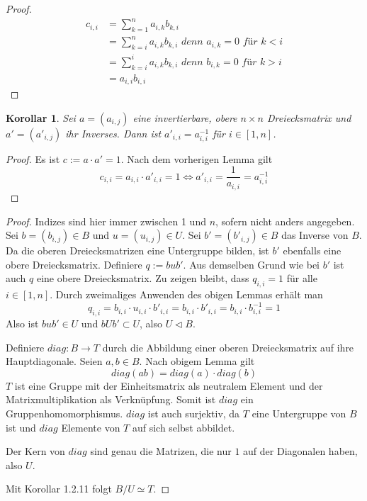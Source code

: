 \documentclass[10pt,a4paper]{article}
\newtheorem{corollary}{Korollar}
\begin{document}
\begin{proof}
  \begin{align*}
    c_{i, i} & = \sum_{k = 1}^{n} a_{i, k} b_{k, i}\\
    & = \sum_{k = i}^{n} a_{i, k} b_{k, i}\textit{ denn $a_{i, k} = 0$ für $k < i$}\\
    & = \sum_{k = i}^{i} a_{i, k} b_{k, i}\textit{ denn $b_{i, k} = 0$ für $k > i$}\\
    & = a_{i, i} b_{i, i}
  \end{align*}
\end{proof}

\begin{corollary}
  Sei $a = (a_{i, j})$ eine invertierbare, obere $n \times n$ Dreiecksmatrix und $a' = (a'_{i, j})$ ihr Inverses.
  Dann ist $a'_{i, i} = a_{i, i}^{-1}$ für $i \in [1, n]$.
\end{corollary}

\begin{proof}
  Es ist $c := a \cdot a' = 1$.
  Nach dem vorherigen Lemma gilt
  \begin{equation}
    c_{i, i} = a_{i, i} \cdot a'_{i, i} = 1 \Leftrightarrow a'_{i, i} = \frac{1}{a_{i, i}} = a_{i, i}^{-1}
  \end{equation}
\end{proof}

\begin{proof}
  Indizes sind hier immer zwischen 1 und $n$, sofern nicht anders angegeben.
  Sei $b = (b_{i, j}) \in B$ und $u = (u_{i, j}) \in U$.
  Sei $b' = (b'_{i, j}) \in B$ das Inverse von $B$.
  Da die oberen Dreiecksmatrizen eine Untergruppe bilden, ist $b'$ ebenfalls eine obere Dreiecksmatrix.
  Definiere $q := bub'$.
  Aus demselben Grund wie bei $b'$ ist auch $q$ eine obere Dreiecksmatrix.
  Zu zeigen bleibt, dass $q_{i, i} = 1$ für alle $i \in [1, n]$.
  Durch zweimaliges Anwenden des obigen Lemmas erhält man
  \begin{equation}
    q_{i, i} = b_{i, i} \cdot u_{i, i} \cdot b'_{i, i} = b_{i, i} \cdot b'_{i, i} = b_{i, i} \cdot b_{i, i}^{-1} = 1
  \end{equation}
  Also ist $bub' \in U$ und $bUb' \subset U$, also $U \triangleleft B$.

  Definiere $diag : B \rightarrow T$ durch die Abbildung einer oberen Dreiecksmatrix auf ihre Hauptdiagonale.
  Seien $a, b \in B$.
  Nach obigem Lemma gilt
  \begin{equation}
    diag(ab) = diag(a) \cdot diag(b)
  \end{equation}
  $T$ ist eine Gruppe mit der Einheitsmatrix als neutralem Element und der Matrixmultiplikation als Verknüpfung.
  Somit ist $diag$ ein Gruppenhomomorphismus.
  $diag$ ist auch surjektiv, da $T$ eine Untergruppe von $B$ ist und $diag$ Elemente von $T$ auf sich selbst abbildet.

  Der Kern von $diag$ sind genau die Matrizen, die nur $1$ auf der Diagonalen haben, also $U$.

  Mit Korollar 1.2.11 folgt $B / U \simeq T$.
\end{proof}
\end{document}
